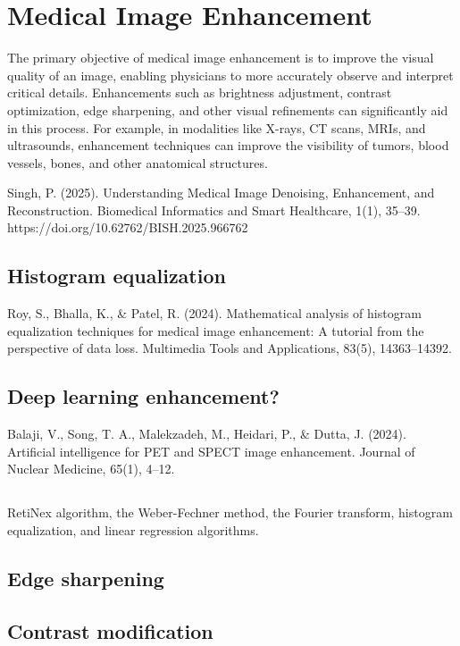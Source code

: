 \chapter{Medical Image Enhancement}

The primary objective of medical image enhancement is to improve the visual quality of an image, enabling physicians to more accurately observe and interpret critical details. Enhancements such as brightness adjustment, contrast optimization, edge sharpening, and other visual refinements can significantly aid in this process. For example, in modalities like X-rays, CT scans, MRIs, and ultrasounds, enhancement techniques can improve the visibility of tumors, blood vessels, bones, and other anatomical structures.

Singh, P. (2025). Understanding Medical Image Denoising, Enhancement, and Reconstruction. Biomedical Informatics and Smart Healthcare, 1(1), 35–39. https://doi.org/10.62762/BISH.2025.966762

\section{Histogram equalization}

Roy, S., Bhalla, K., & Patel, R. (2024). Mathematical analysis of histogram equalization techniques for medical image enhancement: A tutorial from the perspective of data loss. Multimedia Tools and Applications, 83(5), 14363–14392.

\section{Deep learning enhancement?}

Balaji, V., Song, T. A., Malekzadeh, M., Heidari, P., & Dutta, J. (2024). Artificial intelligence for PET and SPECT image enhancement. Journal of Nuclear Medicine, 65(1), 4–12.

\section{}
RetiNex algorithm, the Weber-Fechner method, the Fourier transform, histogram equalization, and linear regression algorithms.

\section{Edge sharpening}

\section{Contrast modification}